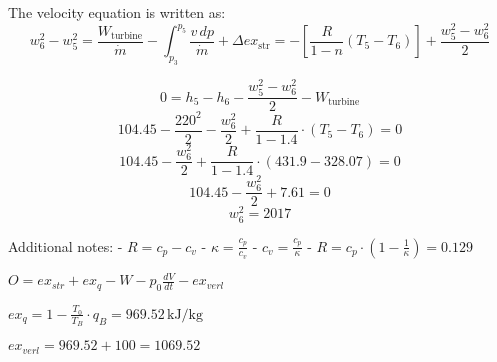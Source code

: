 The velocity equation is written as:  
\[ w_6^2 - w_5^2 = \frac{W_\text{turbine}}{\dot{m}} - \int_{p_3}^{p_5} \frac{v \, dp}{\dot{m}} + \Delta ex_\text{str} = - \left[ \frac{R}{1 - n} \left( T_5 - T_6 \right) \right] + \frac{w_5^2 - w_6^2}{2} \]  

\[ 0 = h_5 - h_6 - \frac{w_5^2 - w_6^2}{2} - W_\text{turbine} \]  
\[ 104.45 - \frac{220^2}{2} - \frac{w_6^2}{2} + \frac{R}{1 - 1.4} \cdot (T_5 - T_6) = 0 \]  
\[ 104.45 - \frac{w_6^2}{2} + \frac{R}{1 - 1.4} \cdot (431.9 - 328.07) = 0 \]  
\[ 104.45 - \frac{w_6^2}{2} + 7.61 = 0 \]  
\[ w_6^2 = 2017 \]  

Additional notes:  
- \( R = c_p - c_v \)  
- \( \kappa = \frac{c_p}{c_v} \)  
- \( c_v = \frac{c_p}{\kappa} \)  
- \( R = c_p \cdot \left( 1 - \frac{1}{\kappa} \right) = 0.129 \)

\( O = ex_{str} + ex_q - W - p_0 \frac{dV}{dt} - ex_{verl} \)  

\( ex_q = 1 - \frac{T_0}{T_B} \cdot q_B = 969.52 \, \text{kJ/kg} \)  

\( ex_{verl} = 969.52 + 100 = 1069.52 \)